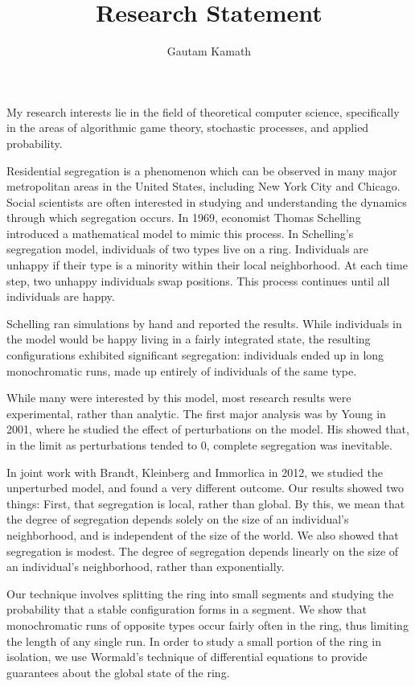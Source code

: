 \documentclass{article}
\title{Research Statement}
\author{Gautam Kamath}
\date{}
\begin{document}
\maketitle
{}
My research interests lie in the field of theoretical computer science,
specifically in the areas of algorithmic game theory, stochastic processes,
and applied probability.

Residential segregation is a phenomenon which can be observed in many
major metropolitan areas in the United States, including New York City and Chicago.
Social scientists are often interested in studying and understanding the dynamics
through which segregation occurs.
In 1969, economist Thomas Schelling introduced a mathematical model to mimic this
process.
In Schelling's segregation model, individuals of two types live on a ring.
Individuals are unhappy if their type is a minority within their local neighborhood.
At each time step, two unhappy individuals swap positions.
This process continues until all individuals are happy.

Schelling ran simulations by hand and reported the results.
While individuals in the model would be happy living in a fairly integrated state,
the resulting configurations exhibited significant segregation:
individuals ended up in long monochromatic runs, made up entirely of individuals of the same type.

While many were interested by this model, most research results were experimental, rather than analytic.
The first major analysis was by Young in 2001, where he studied
the effect of perturbations on the model.
His showed that, in the limit as perturbations tended to $0$, complete segregation was inevitable.

In joint work with Brandt, Kleinberg and Immorlica in 2012, we studied the
unperturbed model, and found a very different outcome.
Our results showed two things:
First, that segregation is local, rather than global.
By this, we mean that the degree of segregation depends solely on the size of an individual's neighborhood,
and is independent of the size of the world.
We also showed that segregation is modest.
The degree of segregation depends linearly on the size of an individual's neighborhood, rather than exponentially.

Our technique involves splitting the ring into small segments 
and studying the probability that a stable configuration forms in a segment.
We show that monochromatic runs of opposite types occur fairly often in the ring,
thus limiting the length of any single run.
In order to study a small portion of the ring in isolation,
we use Wormald's technique of differential equations to provide guarantees
about the global state of the ring.
\end{document}
